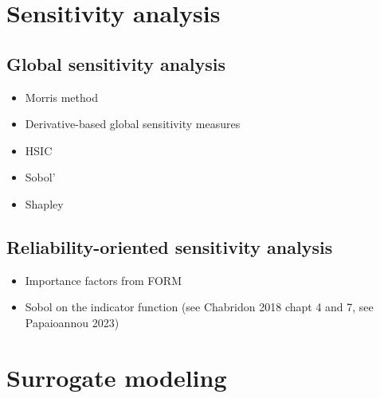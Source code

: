 \newpage
\section{Sensitivity analysis}


\subsection{Global sensitivity analysis}


\begin{itemize}
    \item Morris method
    \item Derivative-based global sensitivity measures
    \item HSIC
\end{itemize}


\begin{itemize}
    \item Sobol'
    \item Shapley
\end{itemize}


\subsection{Reliability-oriented sensitivity analysis}

\begin{itemize}
    \item Importance factors from FORM 
    \item Sobol on the indicator function (see Chabridon 2018 chapt 4 and 7, see Papaioannou 2023)
\end{itemize}



\newpage
\section{Surrogate modeling}

